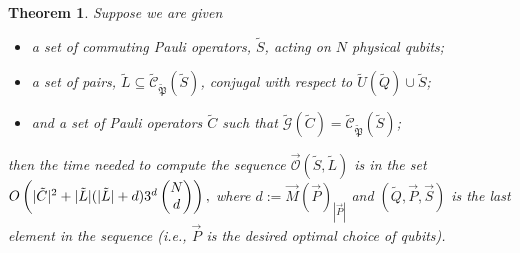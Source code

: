 \documentclass[twocolumn,showpacs,preprintnumbers,amsmath,amssymb,nofootinbib,pra,floatfix]{revtex4-1}
\newtheorem{theorem}{Theorem}
\newcommand{\lst}{\vec}
\newcommand{\set}{\tilde}
\newcommand{\genfun}{\tilde{\mathcal{G}}}
\newcommand{\pauligroup}{{\set{\mathfrak{P}}}}
\newcommand{\centralizer}{\set{\mathcal{C}}}
\newcommand{\optimizer}{\lst{\mathcal{O}}}
\begin{document}
\begin{theorem}
\label{theorem:bound on running time}
Suppose we are given
\begin{itemize}
\item a set of commuting Pauli operators, $\set S$, acting on $N$ physical qubits;
\item a set of pairs, $\set L\subseteq\centralizer_\pauligroup(\set S)$, conjugal with respect to $\set U(\set Q)\cup\set S$;
\item and a set of Pauli operators $\set C$ such that $\genfun(\set C)=\centralizer_\pauligroup(\set S)$;
\end{itemize}
then the time needed to compute the sequence $\optimizer(\set S,\set L)$ is in the set $O\paren{|\set C|^2+|\set L|(|\set L|+d)3^d\choose{N}{d}},$ where $d:=\lst M(\lst P)_{|\lst P|}$ and $(\set Q,\lst P,\lst S)$ is the last element in the sequence (i.e., $\lst P$ is the desired optimal choice of qubits).
\end{theorem}
\end{document}
